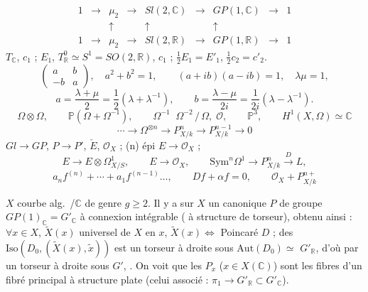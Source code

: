 \documentclass[11pt,a4paper]{article}
\begin{document}
\[
\begin{array}{ccccccccc}
1 & \to & \mu_2 & \to & Sl(2,\mathbb{C}) & \to & GP(1,\mathbb{C}) & \to & 1 \\
  &     & \uparrow &  & \uparrow &  & \uparrow & & \\
1 & \to & \mu_2 & \to & Sl(2,\mathbb{R}) & \to & GP(1,\mathbb{R}) & \to & 1
\end{array}
\]
$T_{\mathbb{C}}$, $c_1$ ; \quad $E_1$, \; $T^0_{\mathbb{R}} \simeq S^1 = SO(2,\mathbb{R})$, \; $c_1$ ; \quad $\tfrac12 E_1 = E'_1$, \quad $\tfrac12 c_2 = c'_2$.
\[
\begin{pmatrix} a & b \\ -b & a \end{pmatrix}, \quad a^2+b^2 = 1, \qquad
(a+ib)(a-ib) = 1, \quad \lambda\mu = 1,
\]
\[
a = \frac{\lambda+\mu}{2} = \frac12(\lambda+\lambda^{-1}), \qquad
b = \frac{\lambda-\mu}{2i} = \frac1{2i}(\lambda-\lambda^{-1}).
\]
\[
\Omega\otimes\Omega, \qquad \mathbb{P}(\Omega+\Omega^{-1}), \qquad
\Omega^{-1}\;\;\Omega^{-2} \,/\, \Omega,\;\mathcal{O}, \qquad
\mathbb{P}^3, \qquad H^1(X,\Omega) \simeq \mathbb{C}
\]
\[
\cdots \to \Omega^{\otimes n} \to P^n_{X/k} \to P^{n-1}_{X/k} \to 0
\]
$Gl \to GP$, \quad $P \to P'$, \quad $\check E$, $\mathcal{O}_X$ ; \quad (n) épi $E \to \mathcal{O}_X$ ;
\[
E \longrightarrow E\otimes\Omega^1_{X/S}, \qquad E \to \mathcal{O}_X, \qquad
\mathrm{Sym}^n\Omega^1 \to P^n_{X/k} \xrightarrow{D} L,
\]
\[
a_nf^{(n)} + \cdots + a_1 f^{(n-1)} \ldots, \qquad Df + \alpha f = 0, \qquad \mathcal{O}_X + P^{n+}_{X/k}
\]
\ill{}

$X$ courbe alg.\ /$\mathbb{C}$  de genre $g\ge2$. Il y a sur $X$ un   canonique $P$ de groupe $GP(1)_{\mathbb{C}} = G'_{\mathbb{C}}$ à connexion intégrable ( à structure de torseur), obtenu ainsi : $\forall x\in X$, $\tilde X(x)$  universel de $X$ en $x$, $\tilde X(x) \Longleftrightarrow$ \struck{\ill{}}  Poincaré $D$ ;  des  $\mathrm{Iso}(D_0,(\tilde X(x),\tilde x))$ est un torseur à droite sous $\mathrm{Aut}(D_0) \simeq$  $G'_{\mathbb{R}}$, d'où par  un torseur à droite sous $G'$,  \struck{\ill{}}. On voit que les $P_x$ ($x\in X(\mathbb{C})$) sont les fibres d'un fibré principal \struck{\ill{}}  à structure plate (celui associé : $\pi_1 \to G'_{\mathbb{R}} \subset G'_{\mathbb{C}}$).
\end{document}
